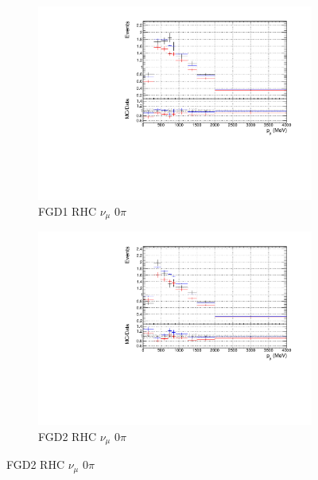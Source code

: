 \begin{figure}[!htbp]
\begin{subfigure}{0.49\textwidth}
  \centering
  \includegraphics[width=\textwidth]{figs/priorpred1D_p_FGD1_NuMuBkg_CC0pi_in_AntiNu_Mode}
  \caption{FGD1 RHC $\nu_{\mu}$ 0$\pi$}
\end{subfigure}
\begin{subfigure}{0.49\textwidth}
  \centering
  \includegraphics[width=\textwidth]{figs/priorpred1D_p_FGD2_NuMuBkg_CC0pi_in_AntiNu_Mode}
  \caption{FGD2 RHC $\nu_{\mu}$ 0$\pi$}
\end{subfigure}


\end{figure}
